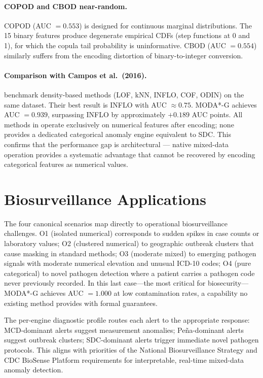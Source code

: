 \documentclass[11pt]{article}
\theoremstyle{plain}
\theoremstyle{definition}
\begin{document}
\paragraph{COPOD and CBOD near-random.}
COPOD (AUC $= 0.553$) is designed for continuous
marginal distributions. The 15 binary features produce
degenerate empirical CDFs (step functions at 0 and 1),
for which the copula tail probability is uninformative.
CBOD (AUC $= 0.554$) similarly suffers from the
encoding distortion of binary-to-integer conversion.

\paragraph{Comparison with Campos et al.\ (2016).}
\citet{campos2016} benchmark density-based methods
(LOF, kNN, INFLO, COF, ODIN) on the same dataset.
Their best result is INFLO with AUC $\approx 0.75$.
MODA*-G achieves AUC $= 0.939$, surpassing INFLO
by approximately $+0.189$ AUC points. All methods in
\citet{campos2016} operate exclusively on numerical
features after encoding; none provides a dedicated
categorical anomaly engine equivalent to SDC. This
confirms that the performance gap is architectural ---
native mixed-data operation provides a systematic
advantage that cannot be recovered by encoding
categorical features as numerical values.

\section{Biosurveillance Applications}
\label{sec:biosurveillance}

The four canonical scenarios map directly to operational
biosurveillance challenges. O1 (isolated numerical)
corresponds to sudden spikes in case counts or laboratory
values; O2 (clustered numerical) to geographic outbreak
clusters that cause masking in standard methods; O3
(moderate mixed) to emerging pathogen signals with
moderate numerical elevation and unusual ICD-10 codes;
O4 (pure categorical) to novel pathogen detection where
a patient carries a pathogen code never previously
recorded. In this last case---the most critical for
biosecurity---MODA*-G achieves AUC $= 1.000$ at low
contamination rates, a capability no existing method
provides with formal guarantees.

The per-engine diagnostic profile routes each alert
to the appropriate response: MCD-dominant alerts suggest
measurement anomalies; Pe\~{n}a-dominant alerts suggest
outbreak clusters; SDC-dominant alerts trigger immediate
novel pathogen protocols. This aligns with priorities of
the National Biosurveillance Strategy \citep{hhs2022}
and CDC BioSense Platform requirements for interpretable,
real-time mixed-data anomaly detection.
\end{document}
